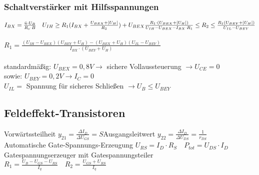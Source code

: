     \subsubsection{Schaltverstärker mit Hilfsspannungen}
    \label{Schaltverstaerker-Hilfsspannungen}
        \large
        $I_{BX}=\frac{\ddot{u}\cdot U_B}{R_c\cdot B}\quad U_{IH}\geq R_1(I_{BX}+\frac{U_{BEX}+|U_H|}{R_2})+U_{BEX}\\\\
        \frac{R_1\cdot (U_{BEX}+|U_H|)}{U_{IH}-U_{BEX}-I_{BX}\cdot R_1}\leq R_2\leq\frac{R_1(U_{BEY}+|U_H|)}{U_{IL}-U_{BEY}}$\\\\
        $R_1=\frac{(U_{IH}-U_{BEX})(U_{BEY}+U_H)-(U_{BEX}+U_H)(U_{IL}-U_{BEY})}{I_{BX}\cdot (U_{BEY}+U_H)}$\\\\
        \normalsize
        standardmäßig: $U_{BEX}=0,8V\rightarrow$ sichere Vollaussteuerung $\rightarrow U_{CE}=0$\\
        sowie: $U_{BEY}=0,2V\rightarrow I_C=0$\\
        $U_{IL}=$ Spannung für sicheres Schließen $\rightarrow U_B\leq U_{BEY}$
\subsection{Feldeffekt-Transistoren}
    Vorwärtssteilheit $y_{21}=\frac{\Delta I_D}{\Delta U_{GS}}=S$\quad Ausgangsleitwert $y_{22}=\frac{\Delta I_D}{\Delta U_{DS}}=\frac{1}{r_{DS}}$\\
    Automatische Gate-Spannungs-Erzeugung $U_{RS}=I_D\cdot R_S\quad P_{tot}=U_{DS}\cdot I_D$\\
    Gatespannungserzeuger mit Gatespannungsteiler $R_1=\frac{U_B-U_{GS}-U_{RS}}{I_q}\quad R_2=\frac{U_{GS}+U_{RS}}{I_q}$

